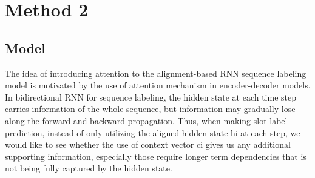 \section{Method 2}

\subsection{Model}
The idea of introducing attention to the alignment-based RNN sequence labeling model is motivated by the use of attention mechanism in encoder-decoder models. In bidirectional RNN for sequence labeling,
the hidden state at each time step carries information of the
whole sequence, but information may gradually lose along the
forward and backward propagation. Thus, when making slot label
prediction, instead of only utilizing the aligned hidden state
hi at each step, we would like to see whether the use of context
vector ci gives us any additional supporting information, especially
those require longer term dependencies that is not being
fully captured by the hidden state.
